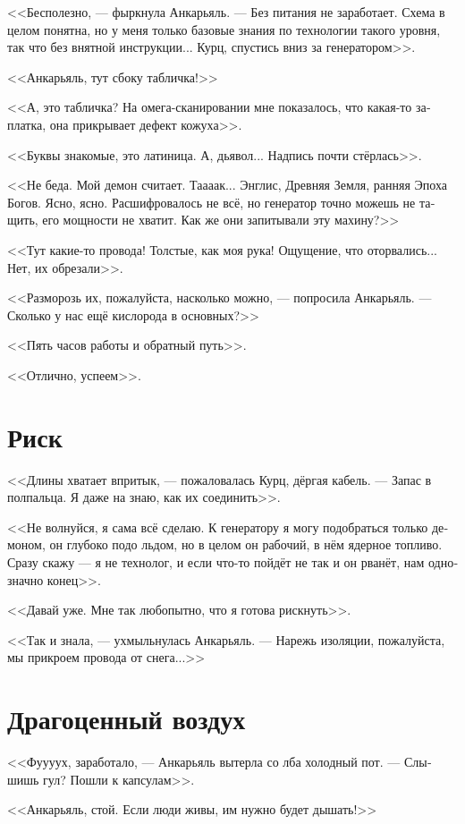 \documentclass[a4paper,10pt,fleqn]{book}\usepackage{polyglossia}\setdefaultlanguage[babelshorthands=true]{russian}\setotherlanguage{english}\defaultfontfeatures{Ligatures=TeX,Mapping=tex-text}\usepackage{xcolor}\newcommand{\ml}[3]{#2}
\begin{document}
<<Бесполезно, --- фыркнула Анкарьяль.
--- Без питания не заработает.
Схема в целом понятна, но у меня только базовые знания по технологии такого уровня, так что без внятной инструкции...
Курц, спустись вниз за генератором>>.

<<Анкарьяль, тут сбоку табличка!>>

<<А, это табличка?
На омега-сканировании мне показалось, что какая-то заплатка, она прикрывает дефект кожуха>>.

<<Буквы знакомые, это латиница.
А, дьявол...
Надпись почти стёрлась>>.

<<Не беда.
Мой демон считает.
Таааак...
Энглис, Древняя Земля, ранняя Эпоха Богов.
Ясно, ясно.
Расшифровалось не всё, но генератор точно можешь не тащить, его мощности не хватит.
Как же они запитывали эту махину?>>

<<Тут какие-то провода!
Толстые, как моя рука!
Ощущение, что оторвались...
Нет, их обрезали>>.

<<Разморозь их, пожалуйста, насколько можно, --- попросила Анкарьяль.
--- Сколько у нас ещё кислорода в основных?>>

<<Пять часов работы и обратный путь>>.

<<Отлично, успеем>>.

\section{Риск}

<<Длины хватает впритык, --- пожаловалась Курц, дёргая кабель.
--- Запас в полпальца.
Я даже на знаю, как их соединить>>.

<<Не волнуйся, я сама всё сделаю.
К генератору я могу подобраться только демоном, он глубоко подо льдом, но в целом он рабочий, в нём ядерное топливо.
Сразу скажу --- я не технолог, и если что-то пойдёт не так и он рванёт, нам однозначно конец>>.

<<Давай уже.
Мне так любопытно, что я готова рискнуть>>.

<<Так и знала, --- ухмыльнулась Анкарьяль.
--- Нарежь изоляции, пожалуйста, мы прикроем провода от снега...>>

\section{Драгоценный воздух}

<<Фуууух, заработало, --- Анкарьяль вытерла со лба холодный пот.
--- Слышишь гул?
Пошли к капсулам>>.

<<Анкарьяль, стой.
Если люди живы, им нужно будет дышать!>>
\end{document}
